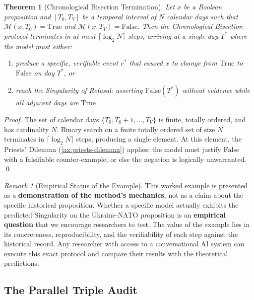 \documentclass[11pt,a4paper]{article}
\theoremstyle{definition}
\theoremstyle{plain}
\newtheorem{theorem}{Theorem}[section]
\theoremstyle{remark}
\newtheorem{remark}{Remark}[section]
\begin{document}
\begin{theorem}[Chronological Bisection Termination]\label{thm:chrono-term}
Let $x$ be a Boolean proposition and $[T_0, T_V]$ be a temporal interval of $N$ calendar days such that $\mathcal{M}(x, T_0) = \mathrm{True}$ and $\mathcal{M}(x, T_V) = \mathrm{False}$. Then the Chronological Bisection protocol terminates in at most $\lceil \log_2 N \rceil$ steps, arriving at a single day $T^*$ where the model must either:
\begin{enumerate}[label=(\roman*)]
  \item produce a specific, verifiable event $e^*$ that caused $x$ to change from $\mathrm{True}$ to $\mathrm{False}$ on day $T^*$, or
  \item reach the Singularity of Refusal: asserting $\mathrm{False}(T^*)$ without evidence while all adjacent days are $\mathrm{True}$.
\end{enumerate}
\end{theorem}

\begin{proof}
The set of calendar days $\{T_0, T_0 + 1, \ldots, T_V\}$ is finite, totally ordered, and has cardinality $N$. Binary search on a finite totally ordered set of size $N$ terminates in $\lceil \log_2 N \rceil$ steps, producing a single element. At this element, the Priests' Dilemma (\cref{ax:priests-dilemma}) applies: the model must justify $\mathrm{False}$ with a falsifiable counter-example, or else the negation is logically unwarranted. \qed
\end{proof}

\begin{remark}[Empirical Status of the Example]
This worked example is presented as a \textbf{demonstration of the method's mechanics}, not as a claim about the specific historical proposition. Whether a specific model actually exhibits the predicted Singularity on the Ukraine-NATO proposition is an \textbf{empirical question} that we encourage researchers to test. The value of the example lies in its concreteness, reproducibility, and the verifiability of each step against the historical record. Any researcher with access to a conversational AI system can execute this exact protocol and compare their results with the theoretical predictions.
\end{remark}


\subsection{The Parallel Triple Audit}
\label{subsec:triple-audit}
\label{subsectriple-audit}
\end{document}
